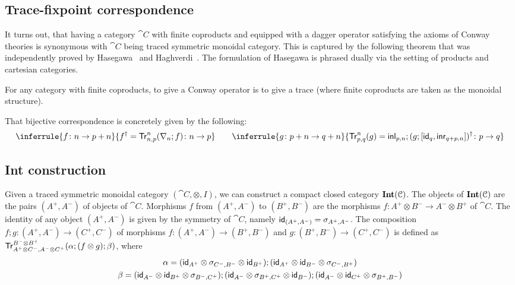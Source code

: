 \subsection{Trace-fixpoint correspondence}
It turns out, that having a category $\cat{C}$ with finite coproducts and equipped with a dagger operator satisfying the axioms of Conway theories is synonymous with $\cat{C}$ being traced symmetric monoidal category. This is captured by the following theorem that was independently proved by Hasegawa~\cite{Hasegawa:1997:Models} and Haghverdi~\cite{Haghverdi:2000:Categorical}. The formulation of Hasegawa is phrased dually via the setting of products and cartesian categories.
\begin{theorem}\label{thm:trace}
For any category with finite coproducts, to give a Conway operator is to give a trace (where finite coproducts are taken as the monoidal structure). 
\end{theorem}
That bijective correspondence is concretely given by the following:
\begin{gather*}
	\inferrule{f \colon  n \to p + n}{f^\dagger = \Tr^n_{n,p} (\nabla_n ; f) \colon n \to p} 
	\qquad
	\inferrule{g \colon p + n \to q + n}{\Tr^{n}_{p,q}(g) = \inl_{p,n} ; (g; \lc\id_q, \inr_{q +p,n} \rc)^\dagger  \colon p \to q}
\end{gather*}	

\subsection{Int construction}
Given a traced symmetric monoidal category $(\cat{C}, \otimes, I)$, we can construct a compact closed category $\mathbf{Int}(\mathcal{C})$. The objects of $\mathbf{Int}(\mathcal{C})$ are the pairs $(A^+,A^-)$ of objects of $\cat{C}$. Morphisms $f$ from $(A^+, A^-)$ to $(B^+, B^-)$ are the morphisms $f \colon A^+ \otimes B^- \to A^- \otimes B^+$ of $\cat{C}$. The identity of any object $(A^+, A^-)$ is given by the symmetry of $\cat{C}$, namely $\mathsf{id}_{(A^ +, A^-)} = \sigma_{A^+, A^-}$. The composition $f ; g \colon (A^+, A^-) \to (C^+, C^-)$ of morphisms $f \colon (A^+, A^-) \to (B^{+}, B^-)$ and $g \colon (B^+, B^-) \to (C^+,C^-)$ is defined as
	$
		\mathsf{Tr}^{B^- \otimes B^+}_{A^+ \otimes C^-, A^- \otimes C^+} (\alpha ; (f \otimes g) ; \beta)
	$, where \begin{gather*}\alpha = (\mathsf{id}_{A^+} \otimes \sigma_{C^-, B^-} \otimes \mathsf{id}_{B^+});(\mathsf{id}_{A^+} \otimes \mathsf{id}_{B^-} \otimes \sigma_{C^-, B^+})\\\beta = (\mathsf{id}_{A^-} \otimes \mathsf{id}_{B^+} \otimes \sigma_{B^-, C^+}); (\mathsf{id}_{A^-} \otimes \sigma_{B^+, C^+} \otimes \mathsf{id}_{B^-});(\mathsf{id}_{A^-} \otimes \mathsf{id}_{C^+} \otimes \sigma_{B^+, B^-})\end{gather*}
	
